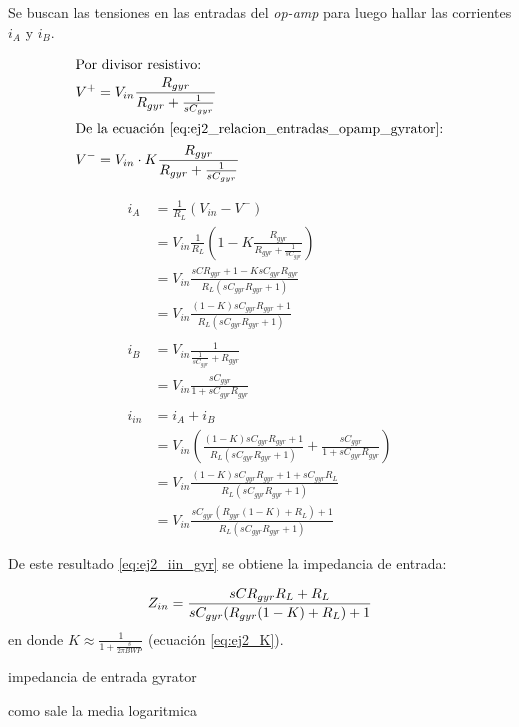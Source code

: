 Se buscan las tensiones en las entradas del \textit{op-amp} para luego hallar las corrientes $i_A$ y $i_B$.

\begin{align}
	\intertext{Por divisor resistivo:}
	V^+&=V_{in}\frac{R_{gyr}}{R_{gyr}+\frac{1}{sC_{gyr}}} \\
	\intertext{De la ecuaci\'on \ref{eq:ej2_relacion_entradas_opamp_gyrator}:}
	V^-&=V_{in}\cdot K \frac{R_{gyr}}{R_{gyr}+\frac{1}{sC_{gyr}}}
\end{align} 

\begin{align*}
i_A &= \frac{1}{R_L}\left(V_{in} - V^-\right)\\
 &= V_{in} \frac{1}{R_L}\left( 1-K\frac{R_{gyr}}{R_{gyr}+\frac{1}{sC_{gyr}}} \right)\\
 &= V_{in} \frac{sCR_{gyr}+1-KsC_{gyr}R_{gyr}}{R_L\left( sC_{gyr}R_{gyr}+1 \right)} \\
 &= V_{in} \frac{(1-K)sC_{gyr}R_{gyr}+1}{R_L\left( sC_{gyr}R_{gyr}+1 \right)}\\
 & \\
i_B &= V_{in} \frac{1}{\frac{1}{sC_{gyr}} + R_{gyr}}\\
	&= V_{in} \frac{sC_{gyr}}{1+sC_{gyr}R_{gyr}}\\
 & \\
i_{in} &= i_A + i_B \\
 &= V_{in} \left( \frac{(1-K)sC_{gyr}R_{gyr}+1}{R_L\left( sC_{gyr}R_{gyr}+1 \right)} +   \frac{sC_{gyr}}{1+sC_{gyr}R_{gyr}}   \right) \\ 
 &= V_{in}  \frac{(1-K)sC_{gyr}R_{gyr}+1 + sC_{gyr}R_L}{R_L\left( sC_{gyr}R_{gyr}+1 \right)} \\
 &= V_{in}  \frac{sC_{gyr}(R_{gyr}(1-K)+R_L) + 1}{R_L(sC_{gyr}R_{gyr}+1)}
\end{align*}

De este resultado \ref{eq:ej2_iin_gyr} se obtiene la impedancia de entrada:

\begin{equation}
	Z_{in}= \frac{ sCR_{gyr}R_L+R_L}{sC_{gyr}(R_{gyr}(1-K)+R_L) + 1} \label{eq:ej2_zin_gyr_sin_aprox} \\
\end{equation}
	en donde	$K  \approx\frac{1}{1+\frac{s}{2\pi BWP}}$ (ecuaci\'on \ref{eq:ej2_K}).


impedancia de entrada gyrator

como sale la media logaritmica
